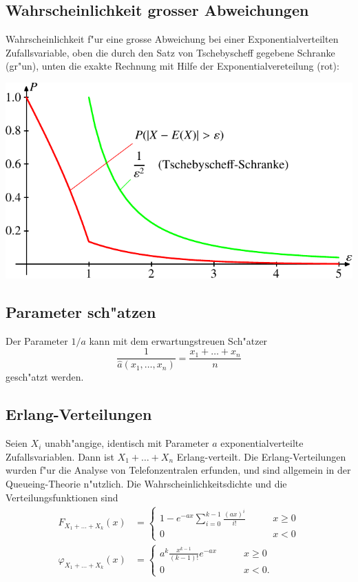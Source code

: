 \subsection{Wahrscheinlichkeit grosser Abweichungen}
Wahrscheinlichkeit f"ur eine grosse Abweichung bei einer
Exponentialverteilten Zufallsvariable, oben die durch den Satz von Tschebyscheff
gegebene Schranke (gr"un), unten die exakte Rechnung mit
Hilfe der Exponentialvereteilung (rot):
\begin{center}
\includegraphics{images/exp-1.pdf}
\end{center}

\subsection{Parameter sch"atzen}
Der Parameter $1/a$ kann mit dem erwartungstreuen Sch"atzer
\[
\frac1{\hat a(x_1,\dots,x_n)}=\frac{x_1+\dots+x_n}n
\]
gesch"atzt werden.

\subsection{Erlang-Verteilungen}
Seien $X_i$ unabh"angige, identisch mit Parameter $a$ exponentialverteilte
Zufallsvariablen.
Dann ist $X_1+\dots+X_n$ Erlang-verteilt. 
Die Erlang-Verteilungen wurden f"ur die Analyse von Telefonzentralen erfunden,
und sind allgemein in der Queueing-Theorie n"utzlich.
Die Wahrscheinlichkeitsdichte und die Verteilungsfunktionen sind
\begin{align*}
F_{X_1+\dots+X_k}(x)&=\begin{cases}
\displaystyle 1-e^{-ax}\sum_{i=0}^{k-1}\frac{(ax)^i}{i!}&\qquad x\ge 0\\
\displaystyle 0&\qquad x < 0
\end{cases}
\\
\varphi_{X_1+\dots+X_k}(x)&=\begin{cases}
\displaystyle a^k\frac{x^{k-1}}{(k-1)!}e^{-ax}&\qquad x\ge 0\\
\displaystyle 0&\qquad x<0.
\end{cases}
\end{align*}
